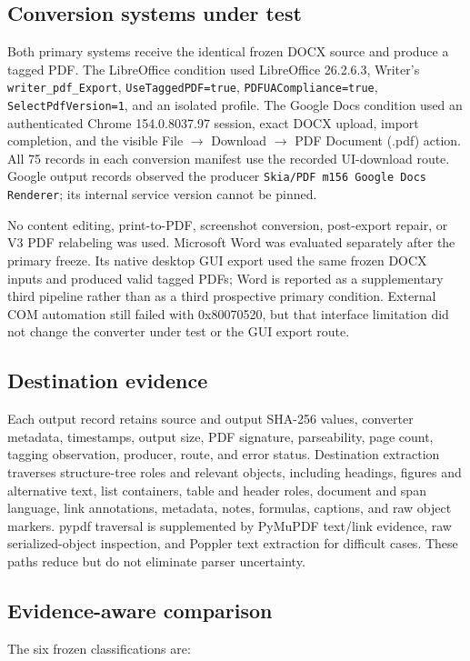 \subsection{Conversion systems under test}
Both primary systems receive the identical frozen DOCX source and produce a tagged PDF. The LibreOffice condition used LibreOffice 26.2.6.3, Writer's \texttt{writer\_pdf\_Export}, \texttt{UseTaggedPDF=true}, \texttt{PDFUACompliance=true}, \texttt{SelectPdfVersion=1}, and an isolated profile. The Google Docs condition used an authenticated Chrome 154.0.8037.97 session, exact DOCX upload, import completion, and the visible File $\rightarrow$ Download $\rightarrow$ PDF Document (.pdf) action. All 75 records in each conversion manifest use the recorded UI-download route. Google output records observed the producer \texttt{Skia/PDF m156 Google Docs Renderer}; its internal service version cannot be pinned.

No content editing, print-to-PDF, screenshot conversion, post-export repair, or V3 PDF relabeling was used. Microsoft Word was evaluated separately after the primary freeze. Its native desktop GUI export used the same frozen DOCX inputs and produced valid tagged PDFs; Word is reported as a supplementary third pipeline rather than as a third prospective primary condition. External COM automation still failed with 0x80070520, but that interface limitation did not change the converter under test or the GUI export route.

\subsection{Destination evidence}
Each output record retains source and output SHA-256 values, converter metadata, timestamps, output size, PDF signature, parseability, page count, tagging observation, producer, route, and error status. Destination extraction traverses structure-tree roles and relevant objects, including headings, figures and alternative text, list containers, table and header roles, document and span language, link annotations, metadata, notes, formulas, captions, and raw object markers. pypdf traversal is supplemented by PyMuPDF text/link evidence, raw serialized-object inspection, and Poppler text extraction for difficult cases. These paths reduce but do not eliminate parser uncertainty.

\subsection{Evidence-aware comparison}
The six frozen classifications are:

